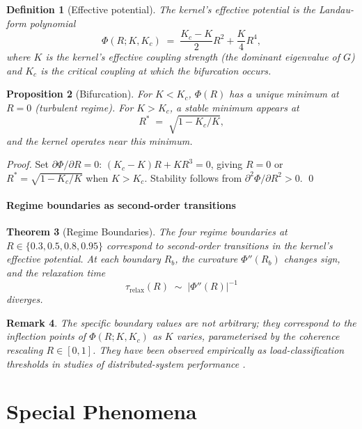 \documentclass[twocolumn,11pt,a4paper]{article}
\newtheorem{theorem}{Theorem}[section]
\newtheorem{proposition}[theorem]{Proposition}
\newtheorem{definition}[theorem]{Definition}
\newtheorem{remark}[theorem]{Remark}
\newcommand{\Rens}{R}
\begin{document}
\begin{definition}[Effective potential]
\label{def:eff-potential}
The kernel's \emph{effective potential} is the Landau-form polynomial
\[
\Phi(\Rens; K, K_c) \;=\; \frac{K_c - K}{2}\Rens^2 + \frac{K}{4}\Rens^4,
\]
where $K$ is the kernel's effective coupling strength (the dominant eigenvalue of $G$) and $K_c$ is the critical coupling at which the bifurcation occurs.
\end{definition}

\begin{proposition}[Bifurcation]
\label{prop:bifurcation}
For $K < K_c$, $\Phi(\Rens)$ has a unique minimum at $\Rens = 0$ (turbulent regime). For $K > K_c$, a stable minimum appears at
\[
\Rens^* \;=\; \sqrt{1 - K_c/K},
\]
and the kernel operates near this minimum.
\end{proposition}

\begin{proof}
Set $\partial\Phi/\partial\Rens = 0$: $(K_c - K)\Rens + K\Rens^3 = 0$, giving $\Rens = 0$ or $\Rens^* = \sqrt{1 - K_c/K}$ when $K > K_c$. Stability follows from $\partial^2\Phi/\partial\Rens^2 > 0$. \qed
\end{proof}

\subsection{Regime boundaries as second-order transitions}

\begin{theorem}[Regime Boundaries]
\label{thm:boundaries}
The four regime boundaries at $\Rens \in \{0.3, 0.5, 0.8, 0.95\}$ correspond to second-order transitions in the kernel's effective potential. At each boundary $\Rens_b$, the curvature $\Phi''(\Rens_b)$ changes sign, and the relaxation time
\[
\tau_\mathrm{relax}(\Rens) \;\sim\; |\Phi''(\Rens)|^{-1}
\]
diverges.
\end{theorem}

\begin{remark}
The specific boundary values are not arbitrary; they correspond to the inflection points of $\Phi(\Rens; K, K_c)$ as $K$ varies, parameterised by the coherence rescaling $\Rens \in [0,1]$. They have been observed empirically as load-classification thresholds in studies of distributed-system performance \citep{breakspear2017,strogatz2000}.
\end{remark}

\part{Special Phenomena}
\end{document}
